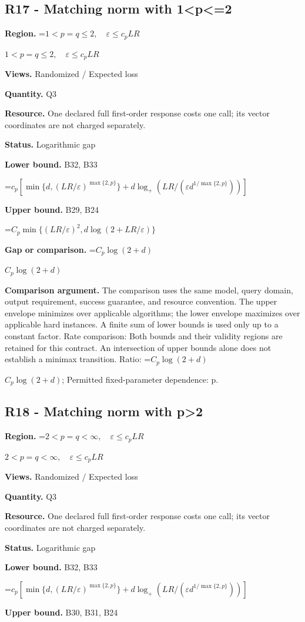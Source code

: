 \documentclass[10pt,a4paper]{article}
\newcommand{\AtlasMath}[1]{\par\begingroup\centering\setbox0=\hbox{$\displaystyle #1$}\ifdim\wd0>1.4\linewidth\typeout{ATLAS WIDE FORMULA: \the\wd0}\fi\ifdim\wd0>\linewidth\resizebox{\linewidth}{!}{\box0}\else\box0\fi\par\endgroup}
\newcommand{\AtlasInlineMath}[1]{\begingroup\setbox0=\hbox{$#1$}\ifdim\wd0>.4\linewidth\endgroup\AtlasMath{#1}\else\endgroup$#1$\fi}
\begin{document}
\subsection{R17 - Matching norm with 1<p<=2}
\textbf{Region.} \AtlasInlineMath{1<p=q\le2,\quad\varepsilon\le c_pLR}

\textbf{Views.} Randomized / Expected loss

\textbf{Quantity.} Q3

\textbf{Resource.} One declared full first-order response costs one call; its vector coordinates are not charged separately.

\textbf{Status.} Logarithmic gap

\textbf{Lower bound.} B32, B33

\AtlasMath{c_p[\min\{d,(LR/\varepsilon)^{\max\{2,p\}}\}+d\log_+(LR/(\varepsilon d^{1/\max\{2,p\}}))]}
\textbf{Upper bound.} B29, B24

\AtlasMath{C_p\min\{(LR/\varepsilon)^2,d\log(2+LR/\varepsilon)\}}
\textbf{Gap or comparison.} \AtlasInlineMath{C_p\log(2+d)}

\textbf{Comparison argument.} The comparison uses the same model, query domain, output requirement, success guarantee, and resource convention. The upper envelope minimizes over applicable algorithms; the lower envelope maximizes over applicable hard instances. A finite sum of lower bounds is used only up to a constant factor. Rate comparison: Both bounds and their validity regions are retained for this contract. An intersection of upper bounds alone does not establish a minimax transition. Ratio: \AtlasInlineMath{C_p\log(2+d)}; Permitted fixed-parameter dependence: p.

\subsection{R18 - Matching norm with p>2}
\textbf{Region.} \AtlasInlineMath{2<p=q<\infty,\quad\varepsilon\le c_pLR}

\textbf{Views.} Randomized / Expected loss

\textbf{Quantity.} Q3

\textbf{Resource.} One declared full first-order response costs one call; its vector coordinates are not charged separately.

\textbf{Status.} Logarithmic gap

\textbf{Lower bound.} B32, B33

\AtlasMath{c_p[\min\{d,(LR/\varepsilon)^{\max\{2,p\}}\}+d\log_+(LR/(\varepsilon d^{1/\max\{2,p\}}))]}
\textbf{Upper bound.} B30, B31, B24
\end{document}
